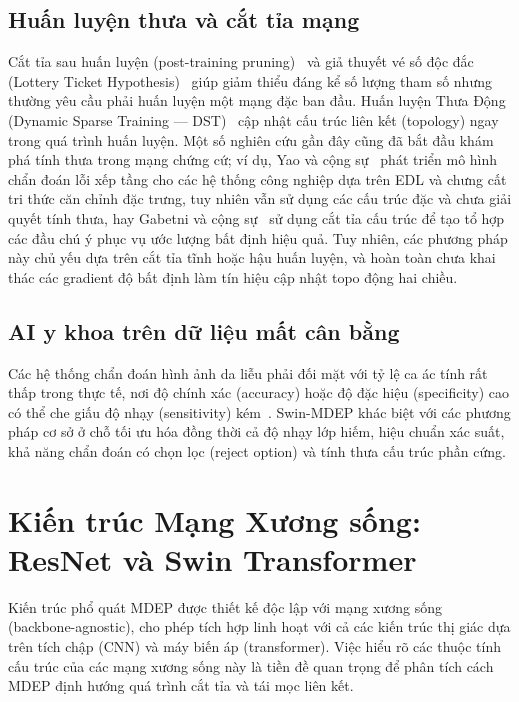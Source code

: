 \documentclass[11pt, a4paper]{article}
\begin{document}
\subsection{Huấn luyện thưa và cắt tỉa mạng}
Cắt tỉa sau huấn luyện (post-training pruning)~\cite{han2016deep} và giả thuyết vé số độc đắc (Lottery Ticket Hypothesis)~\cite{frankle2019lottery} giúp giảm thiểu đáng kể số lượng tham số nhưng thường yêu cầu phải huấn luyện một mạng đặc ban đầu. Huấn luyện Thưa Động (Dynamic Sparse Training --- DST)~\cite{mocanu2018scalable, evci2020rigging} cập nhật cấu trúc liên kết (topology) ngay trong quá trình huấn luyện. Một số nghiên cứu gần đây cũng đã bắt đầu khám phá tính thưa trong mạng chứng cứ; ví dụ, Yao và cộng sự~\cite{yao2025cascaded} phát triển mô hình chẩn đoán lỗi xếp tầng cho các hệ thống công nghiệp dựa trên EDL và chưng cất tri thức căn chỉnh đặc trưng, tuy nhiên vẫn sử dụng các cấu trúc đặc và chưa giải quyết tính thưa, hay Gabetni và cộng sự~\cite{gabetni2026ensembling} sử dụng cắt tỉa cấu trúc để tạo tổ hợp các đầu chú ý phục vụ ước lượng bất định hiệu quả. Tuy nhiên, các phương pháp này chủ yếu dựa trên cắt tỉa tĩnh hoặc hậu huấn luyện, và hoàn toàn chưa khai thác các gradient độ bất định làm tín hiệu cập nhật topo động hai chiều.

\subsection{AI y khoa trên dữ liệu mất cân bằng}
Các hệ thống chẩn đoán hình ảnh da liễu phải đối mặt với tỷ lệ ca ác tính rất thấp trong thực tế, nơi độ chính xác (accuracy) hoặc độ đặc hiệu (specificity) cao có thể che giấu độ nhạy (sensitivity) kém~\cite{esteva2017dermatologist, johnson2019survey}. Swin-MDEP khác biệt với các phương pháp cơ sở ở chỗ tối ưu hóa đồng thời cả độ nhạy lớp hiếm, hiệu chuẩn xác suất, khả năng chẩn đoán có chọn lọc (reject option) và tính thưa cấu trúc phần cứng.

\section{Kiến trúc Mạng Xương sống: ResNet và Swin Transformer}\label{sec:backbones}

Kiến trúc phổ quát MDEP được thiết kế độc lập với mạng xương sống (backbone-agnostic), cho phép tích hợp linh hoạt với cả các kiến trúc thị giác dựa trên tích chập (CNN) và máy biến áp (transformer). Việc hiểu rõ các thuộc tính cấu trúc của các mạng xương sống này là tiền đề quan trọng để phân tích cách MDEP định hướng quá trình cắt tỉa và tái mọc liên kết.
\end{document}
